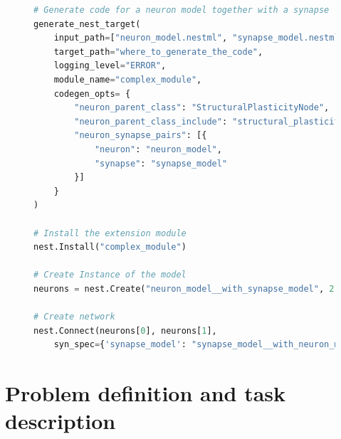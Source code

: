 \begin{figure}[ht!]
\centering
\begin{lstlisting}[language=Python, label=lst:nestml_with_synapse, caption={The \texttt{generate\_nest\_target} function generates code for the neuron and synapse together. The \texttt{input\_path} takes a list of NESTML files with the first being the neuron model and the second the synapse model. The library will be generated with the name \emph{complex\_module}. In contrast to the simple case in \autoref{lst:nestml_without_synapse}, co-generating the code for the neuron and synapse requires the user to provide the \texttt{codegen\_opts} to specify the relation between the neuron and the synapse. Installing the new library is not different from the previous case, we simply call the \texttt{Install()} function with \emph{complex\_module} as the library name. The main difference is in the creation of model instances. The neuron model is no longer registered in NEST under the name \emph{"neuron\_model}, but the neuron name is now the concatenation of the neuron name and the synapse name to express the relation between the two. The same name mangling is applied for the synapse models, which becomes available under the name \emph{synapse\_model\_\_with\_neuron\_model}. These name changes have to be manually tracked by the user when calling \texttt{Create()} and \texttt{Connect()}.}, captionpos=b]
# Generate code for a neuron model together with a synapse
generate_nest_target(
    input_path=["neuron_model.nestml", "synapse_model.nestml"],
    target_path="where_to_generate_the_code",
    logging_level="ERROR",
    module_name="complex_module",
    codegen_opts= {
        "neuron_parent_class": "StructuralPlasticityNode",
        "neuron_parent_class_include": "structural_plasticity_node.h",
        "neuron_synapse_pairs": [{
            "neuron": "neuron_model",
            "synapse": "synapse_model"
        }]
    }
)

# Install the extension module
nest.Install("complex_module")
                                                          
# Create Instance of the model
neurons = nest.Create("neuron_model__with_synapse_model", 2)

# Create network
nest.Connect(neurons[0], neurons[1],
    syn_spec={'synapse_model': "synapse_model__with_neuron_model"})
\end{lstlisting}
\end{figure}


\section{Problem definition and task description}


